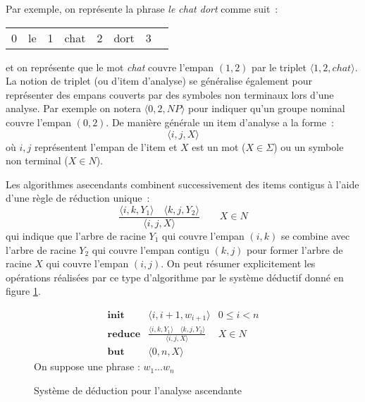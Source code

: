 \documentclass[11pt,openany]{book}
\begin{document}
Par exemple, on représente la phrase {\em le chat dort} comme suit~:
\begin{center}
\begin{tabular}{cccccccc}
0  &le &1 &chat &2 &dort& 3
\end{tabular}
\end{center}
et on représente que le mot {\em chat} couvre l'empan $(1,2)$ par le triplet $\langle 1,2,chat\rangle$. 
La notion de triplet (ou d'item d'analyse) se généralise également pour représenter des empans couverts par des symboles
non terminaux lors d'une analyse. Par exemple on notera $\langle 0,2, NP \rangle$ pour indiquer qu'un groupe nominal couvre l'empan 
$(0,2)$. De manière générale un item d'analyse a la forme~:
\begin{displaymath}
\langle i,j, X\rangle
\end{displaymath}
où $i,j$ représentent l'empan de l'item et $X$ est un mot ($X\in \Sigma$) ou un symbole non terminal ($X \in N$).

Les algorithmes asecendants combinent successivement des items contigus à l'aide d'une règle de réduction unique~:
\begin{equation}
\label{eq-cky-reduce}
\frac{\langle i,k, Y_1\rangle\quad\langle k,j,Y_2 \rangle}{\langle i,j, X\rangle} \qquad X \in N
\end{equation}
qui indique que l'arbre de racine $Y_1$ qui couvre l'empan $(i,k)$ se combine avec l'arbre de racine
$Y_2$ qui couvre l'empan contigu $(k,j)$ pour former l'arbre de racine $X$ qui couvre l'empan
$(i,j)$.
On peut résumer explicitement les opérations réalisées par ce type d'algorithme par le système déductif 
donné en figure \ref{fig-deductive}.
\begin{figure}[htbp]
\begin{center}
\begin{displaymath}
\begin{array}{lll}
\mathbf{init} & \langle i,i+1, w_{i+1} \rangle& 0\leq i < n\\
\mathbf{reduce}&\frac{\langle i,k, Y_1\rangle\quad\langle k,j,Y_2 \rangle}{\langle i,j, X\rangle} & X \in N\\
\mathbf{but}&\langle 0,n, X \rangle
\end{array}
\end{displaymath}
On suppose une phrase : $w_1\ldots w_n$
\end{center}
\caption{\label{fig-deductive}Système de déduction pour l'analyse ascendante}
\end{figure}
\end{document}
